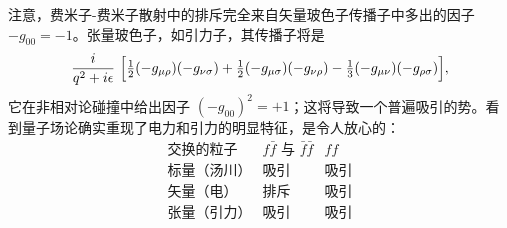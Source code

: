 注意，费米子-费米子散射中的排斥完全来自矢量玻色子传播子中多出的因子 $-g_{00} = -1$。张量玻色子，如引力子，其传播子将是
\begin{equation}
  \frac{i}{q^2+i\epsilon}\ \Bigl[
    \tfrac{1}{2}(-g_{\mu\rho})(-g_{\nu\sigma}) + \tfrac{1}{2}(-g_{\mu\sigma})
      (-g_{\nu\rho}) - \tfrac{1}{3}(-g_{\mu\nu})(-g_{\rho\sigma}) \Bigr] ,
  \label{eq:4.136}
\end{equation}
它在非相对论碰撞中给出因子 $(-g_{00})^2 = +1$；这将导致一个普遍吸引的势。看到量子场论确实重现了电力和引力的明显特征，是令人放心的：
\begin{equation}
  \begin{array}{ccc}
    \text{交换的粒子} & f\bar{f}\text{ 与 }\bar{f}\bar{f} & ff\\
    \hline
    \text{标量（汤川）} & \text{吸引} & \text{吸引}\\
    \text{矢量（电）} & \text{排斥} & \text{吸引}\\
    \text{张量（引力）} & \text{吸引} & \text{吸引}
  \end{array}
  \label{eq:4.137}
\end{equation}

\problems

